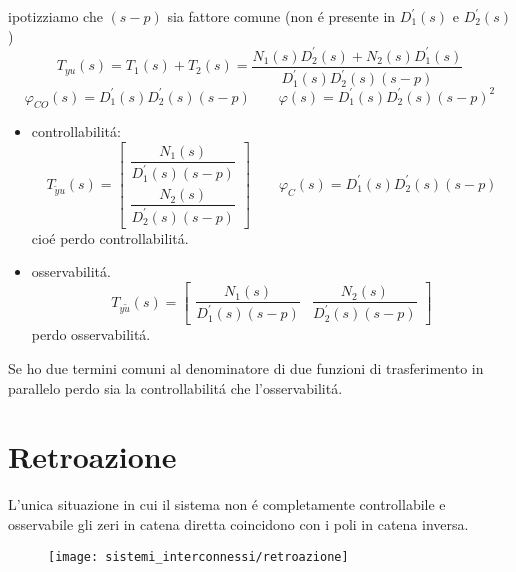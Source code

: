 \documentclass[../main.tex]{subfiles}
\begin{document}
\begin{itemize}
				ipotizziamo che $ (s-p) $ sia fattore comune (non \'e presente in $ D_1^{'}(s) $ e $ D_2^{'}(s) $)
				\[
					T_{yu}(s) = T_1(s) + T_2(s) = 
					\dfrac{N_1(s)D_2^{'}(s) + N_2(s)D_1^{'}(s)}{D_1^{'}(s) D_2^{'}(s) (s-p)}
				\]
				\[
					\varphi_{CO}(s) = D_1^{'}(s) D_2^{'}(s) (s-p) \qquad \varphi(s) = D_1^{'}(s) D_2^{'}(s) (s-p)^2
				\]
				\begin{itemize}
					\item 
						controllabilit\'a:
						\[
							T_{\tilde y u}(s) =
							\begin{bmatrix}
								\dfrac{N_1(s)}{D_1^{'}(s) (s-p)}\\
								\dfrac{N_2(s)}{D_2^{'}(s) (s-p)}
							\end{bmatrix}
							\qquad
							\varphi_C(s) = D_1^{'}(s) D_2^{'}(s) (s-p)
						\]
						cio\'e perdo controllabilit\'a.
					\item 
						osservabilit\'a.
						\[
							T_{y \tilde u}(s) = 
							\begin{bmatrix}
								\dfrac{N_1(s)}{D_1^{'}(s) (s-p)} &
								\dfrac{N_2(s)}{D_2^{'}(s) (s-p)}
							\end{bmatrix}
						\]
						perdo osservabilit\'a.
				\end{itemize}
			Se ho due termini comuni al denominatore di due funzioni di trasferimento in parallelo perdo sia la controllabilit\'a che l'osservabilit\'a.
		\end{itemize}
	
	\section{Retroazione}
		L'unica situazione in cui il sistema non \'e completamente controllabile e osservabile gli zeri in catena diretta coincidono con i poli in catena inversa.
		\begin{figure}[H]
			\centering\texttt{[image: sistemi\_interconnessi/retroazione]}
		\end{figure}
	
\end{document}
